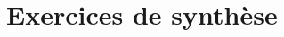 \documentclass[11pt,fleqn, openany]{book} %
\begin{document}
%



\section*{Exercices de synthèse}
\end{document}
